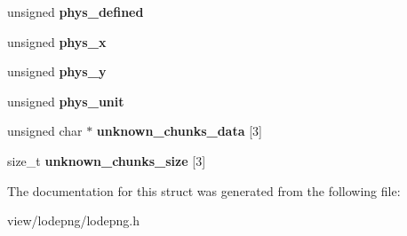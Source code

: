 \begin{DoxyCompactItemize}
\item 
\hypertarget{struct_lode_p_n_g_info_a9b8e29b7e7b4908a2de0275e01a828ed}{unsigned {\bfseries phys\-\_\-defined}}\label{struct_lode_p_n_g_info_a9b8e29b7e7b4908a2de0275e01a828ed}

\item 
\hypertarget{struct_lode_p_n_g_info_a1593fa6e1acc93f3b9de51c340bef94d}{unsigned {\bfseries phys\-\_\-x}}\label{struct_lode_p_n_g_info_a1593fa6e1acc93f3b9de51c340bef94d}

\item 
\hypertarget{struct_lode_p_n_g_info_a52ad7a105244d00f1e91c489eaf53f97}{unsigned {\bfseries phys\-\_\-y}}\label{struct_lode_p_n_g_info_a52ad7a105244d00f1e91c489eaf53f97}

\item 
\hypertarget{struct_lode_p_n_g_info_ad6f2171d9f87716e5010f6c5352f9855}{unsigned {\bfseries phys\-\_\-unit}}\label{struct_lode_p_n_g_info_ad6f2171d9f87716e5010f6c5352f9855}

\item 
\hypertarget{struct_lode_p_n_g_info_a8347476da7fc2fc6af4ec7ed44b638c6}{unsigned char $\ast$ {\bfseries unknown\-\_\-chunks\-\_\-data} \mbox{[}3\mbox{]}}\label{struct_lode_p_n_g_info_a8347476da7fc2fc6af4ec7ed44b638c6}

\item 
\hypertarget{struct_lode_p_n_g_info_a25a81d760759bd0383ae5a81ba83911d}{size\-\_\-t {\bfseries unknown\-\_\-chunks\-\_\-size} \mbox{[}3\mbox{]}}\label{struct_lode_p_n_g_info_a25a81d760759bd0383ae5a81ba83911d}

\end{DoxyCompactItemize}


The documentation for this struct was generated from the following file\-:\begin{DoxyCompactItemize}
\item 
view/lodepng/lodepng.\-h\end{DoxyCompactItemize}
